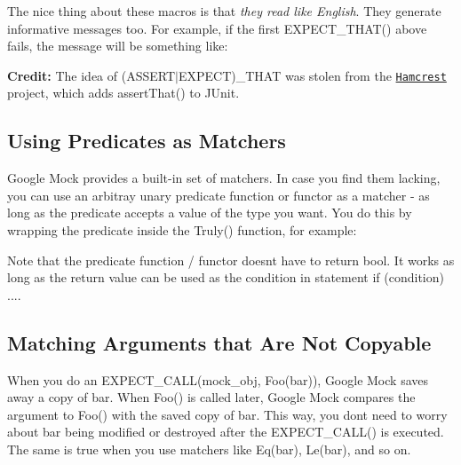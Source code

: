 The nice thing about these macros is that {\itshape they read like English}. They generate informative messages too. For example, if the first {\ttfamily E\+X\+P\+E\+C\+T\+\_\+\+T\+H\+A\+T()} above fails, the message will be something like\+:


\begin{DoxyCode}{0}
\end{DoxyCode}


{\bfseries Credit\+:} The idea of {\ttfamily (A\+S\+S\+E\+R\+T$\vert$\+E\+X\+P\+E\+CT)\+\_\+\+T\+H\+AT} was stolen from the \href{https://github.com/hamcrest/}{\tt Hamcrest} project, which adds {\ttfamily assert\+That()} to J\+Unit.

\subsection*{Using Predicates as Matchers}

Google Mock provides a built-\/in set of matchers. In case you find them lacking, you can use an arbitray unary predicate function or functor as a matcher -\/ as long as the predicate accepts a value of the type you want. You do this by wrapping the predicate inside the {\ttfamily Truly()} function, for example\+:


\begin{DoxyCode}{0}
\DoxyCodeLine{}
\DoxyCodeLine{}
\end{DoxyCode}


Note that the predicate function / functor doesn\textquotesingle{}t have to return {\ttfamily bool}. It works as long as the return value can be used as the condition in statement {\ttfamily if (condition) ...}.

\subsection*{Matching Arguments that Are Not Copyable}

When you do an {\ttfamily E\+X\+P\+E\+C\+T\+\_\+\+C\+A\+L\+L(mock\+\_\+obj, Foo(bar))}, Google Mock saves away a copy of {\ttfamily bar}. When {\ttfamily Foo()} is called later, Google Mock compares the argument to {\ttfamily Foo()} with the saved copy of {\ttfamily bar}. This way, you don\textquotesingle{}t need to worry about {\ttfamily bar} being modified or destroyed after the {\ttfamily E\+X\+P\+E\+C\+T\+\_\+\+C\+A\+L\+L()} is executed. The same is true when you use matchers like {\ttfamily Eq(bar)}, {\ttfamily Le(bar)}, and so on.


